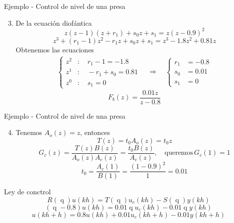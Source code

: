 \documentclass[presentation,aspectratio=169]{beamer}
\DeclareMathOperator{\shift}{q}
\begin{document}
\begin{frame}[label={sec:orgfc8bccb}]{Ejemplo - Control de nivel de una presa}
\begin{enumerate}
\setcounter{enumi}{2}
\item De la ecuación diofántica \[ z(z-1)(z+r_1) + s_0z + s_1 = z(z-0.9)^2\]
\[ z^3 + (r_1-1)z^2 - r_1z + s_0z + s_1 = z^3 -1.8z^2 + 0.81z\]
Obtenemos las ecuaciones 
\begin{align*}
\begin{cases} z^2 &: \quad r_1-1 = -1.8\\
z^1 &: \quad -r_1 + s_0 = 0.81\\
z^0 &: \quad s_1 = 0
\end{cases}
\quad \Rightarrow \quad 
\begin{cases} r_1 &= -0.8\\ s_0 &= 0.01\\ s_1 &=0 \end{cases}
\end{align*}
\[F_b(z) = \frac{0.01z}{z - 0.8}\]
\end{enumerate}
\end{frame}

\begin{frame}[label={sec:org8abf5fe}]{Ejemplo - Control de nivel de una presa}
\begin{enumerate}
\setcounter{enumi}{3}
\item Tenemos \(A_o(z) = z\), entonces 
\[T(z) = t_0A_o(z) = t_0z\]
\[G_c(z) = \frac{T(z)B(z)}{A_o(z)A_c(z)} = \frac{t_0 B(z)}{A_c(z)}, \quad \text{queremos}\, G_c(1)=1\]
\[ t_0 = \frac{A_c(1)}{B(1)} = \frac{(1-0.9)^2}{1} = 0.01\]
\end{enumerate}

\alert{Ley de conctrol}
\[R(\shift) u(kh) = T(\shift)u_c(kh) - S(\shift)y(kh)\]
\[ (\shift - 0.8)u(kh) = 0.01\shift u_c(kh) - 0.01\shift y(kh)\]
\[ u(kh+h) = 0.8u(kh) + 0.01 u_c(kh+h) - 0.01y(kh+h)\]
\end{frame}
\end{document}
